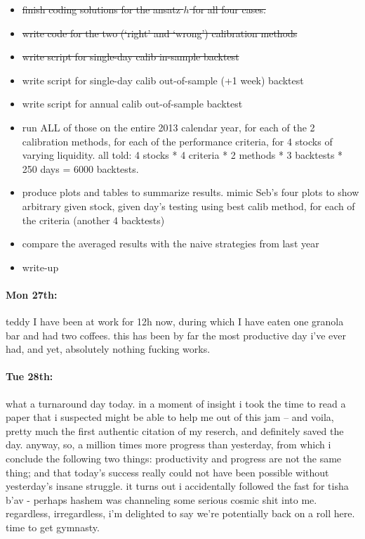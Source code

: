 \documentclass[12pt]{article}
\begin{document}
\begin{itemize}
\item \st{finish coding solutions for the ansatz $h$ for all four cases.}
\item \st{write code for the two (`right' and `wrong') calibration methods}
\item \st{write script for single-day calib in-sample backtest}
\item write script for single-day calib out-of-sample (+1 week) backtest
\item write script for annual calib out-of-sample backtest
\item run ALL of those on the entire 2013 calendar year, for each of the 2 calibration methods, for each of the performance criteria, for 4 stocks of varying liquidity. all told: 4 stocks * 4 criteria * 2 methods * 3 backtests * 250 days = 6000 backtests.
\item produce plots and tables to summarize results. mimic Seb's four plots to show arbitrary given stock, given day's testing using best calib method, for each of the criteria (another 4 backtests)
\item compare the averaged results with the naive strategies from last year
\item write-up
\end{itemize}

\paragraph{Mon 27th:} teddy I have been at work for 12h now, during which I have eaten one granola bar and had two coffees. this has been by far the most productive day i've ever had, and yet, absolutely nothing fucking works.

\paragraph{Tue 28th:} what a turnaround day today. in a moment of insight i took the time to read a paper that i suspected might be able to help me out of this jam -- and voila, pretty much the first authentic citation of my reserch, and definitely saved the day. anyway, so, a million times more progress than yesterday, from which i conclude the following two things: productivity and progress are not the same thing; and that today's success really could not have been possible without yesterday's insane struggle. it turns out i accidentally followed the fast for tisha b'av - perhaps hashem was channeling some serious cosmic shit into me. regardless, irregardless, i'm delighted to say we're potentially back on a roll here. time to get gymnasty.
\end{document}
